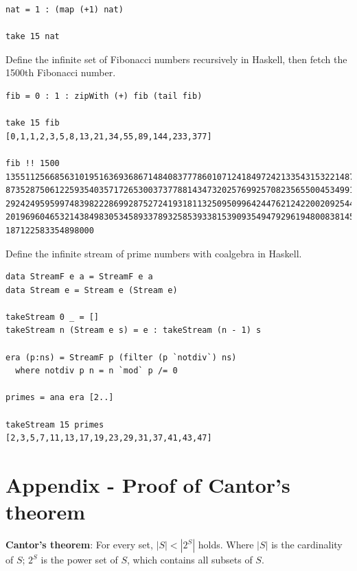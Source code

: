 \documentclass{article}
\begin{document}
\lstset{frame=single, language=Haskell}
\begin{lstlisting}
nat = 1 : (map (+1) nat)

take 15 nat
\end{lstlisting}

Define the infinite set of Fibonacci numbers recursively in Haskell, then fetch the 1500th Fibonacci number.

\lstset{frame=single, language=Haskell}
\begin{lstlisting}
fib = 0 : 1 : zipWith (+) fib (tail fib)

take 15 fib
[0,1,1,2,3,5,8,13,21,34,55,89,144,233,377]

fib !! 1500
13551125668563101951636936867148408377786010712418497242133543153221487310
87352875061225935403571726530037377881434732025769925708235655004534991410
29242495959974839822286992875272419318113250950996424476212422002092544399
20196960465321438498305345893378932585393381539093549479296194800838145996
187122583354898000
\end{lstlisting}

Define the infinite stream of prime numbers with coalgebra in Haskell.

\lstset{frame=single, language=Haskell}
\begin{lstlisting}
data StreamF e a = StreamF e a
data Stream e = Stream e (Stream e)

takeStream 0 _ = []
takeStream n (Stream e s) = e : takeStream (n - 1) s

era (p:ns) = StreamF p (filter (p `notdiv`) ns)
  where notdiv p n = n `mod` p /= 0

primes = ana era [2..]

takeStream 15 primes
[2,3,5,7,11,13,17,19,23,29,31,37,41,43,47]
\end{lstlisting}

\section{Appendix - Proof of Cantor's theorem}

\begin{theorem}
\textbf{Cantor's theorem}: For every set, $|S| < |2^S|$ holds. Where $|S|$ is the cardinality of $S$; $2^S$ is the power set of $S$, which contains all subsets of $S$.
\end{theorem}
\end{document}
